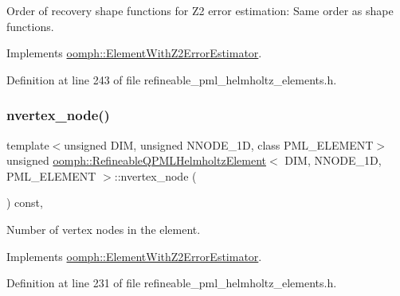 Order of recovery shape functions for Z2 error estimation\+: Same order as shape functions. 



Implements \hyperlink{classoomph_1_1ElementWithZ2ErrorEstimator_af39480835bd3e0f6b2f4f7a9a4044798}{oomph\+::\+Element\+With\+Z2\+Error\+Estimator}.



Definition at line 243 of file refineable\+\_\+pml\+\_\+helmholtz\+\_\+elements.\+h.

\mbox{\label{classoomph_1_1RefineableQPMLHelmholtzElement_abaa7c8665be12c2be2eb14f17c5feef8}} 
\subsubsection{\texorpdfstring{nvertex\+\_\+node()}{nvertex\_node()}}
{\footnotesize\ttfamily template$<$unsigned D\+IM, unsigned N\+N\+O\+D\+E\+\_\+1D, class P\+M\+L\+\_\+\+E\+L\+E\+M\+E\+NT$>$ \\
unsigned \hyperlink{classoomph_1_1RefineableQPMLHelmholtzElement}{oomph\+::\+Refineable\+Q\+P\+M\+L\+Helmholtz\+Element}$<$ D\+IM, N\+N\+O\+D\+E\+\_\+1D, P\+M\+L\+\_\+\+E\+L\+E\+M\+E\+NT $>$\+::nvertex\+\_\+node (\begin{DoxyParamCaption}{ }\end{DoxyParamCaption}) const\hspace{0.3cm}{\ttfamily [inline]}, {\ttfamily [virtual]}}



Number of vertex nodes in the element. 



Implements \hyperlink{classoomph_1_1ElementWithZ2ErrorEstimator_a19495a0e77ef4ff35f15fdf7913b4077}{oomph\+::\+Element\+With\+Z2\+Error\+Estimator}.



Definition at line 231 of file refineable\+\_\+pml\+\_\+helmholtz\+\_\+elements.\+h.

\mbox{\label{classoomph_1_1RefineableQPMLHelmholtzElement_a27b1fabd3fcd677628035f2a8e2175f7}} 
